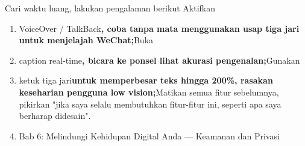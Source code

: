 \begin{tcbpractice}{Cari waktu luang, lakukan pengalaman berikut}
Aktifkan

\begin{enumerate}
  \item VoiceOver / TalkBack\textbf{, coba tanpa mata menggunakan usap tiga jari untuk menjelajah WeChat;}Buka
  \item caption real-time\textbf{, bicara ke ponsel lihat akurasi pengenalan;}Gunakan
  \item ketuk tiga jari\textbf{untuk memperbesar teks hingga 200\%, rasakan keseharian pengguna low vision;}Matikan semua fitur sebelumnya, pikirkan "jika saya selalu membutuhkan fitur-fitur ini, seperti apa saya berharap didesain".
  \item Bab 6: Melindungi Kehidupan Digital Anda — Keamanan dan Privasi
\end{enumerate}

\end{tcbpractice}
